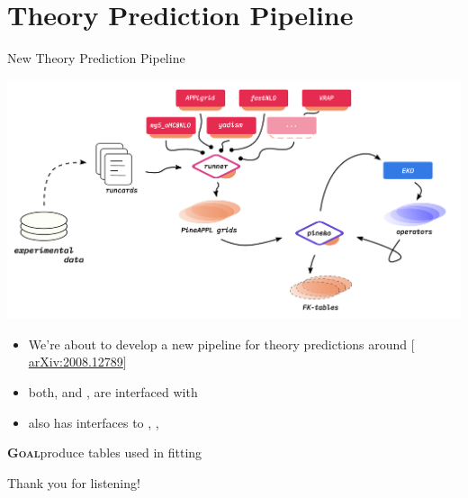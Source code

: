 \documentclass[9pt]{beamer}
\providecommand{\iRef}[1]{{\color{mLightGreen}\small $[$#1$]$}}
\begin{document}
\section{Theory Prediction Pipeline}

\begin{frame}{New Theory Prediction Pipeline}
	\begin{center}
		\includegraphics[width=.8\linewidth]{fk}
	\end{center}

	\begin{itemize}
        \item We're about to develop a new pipeline for theory predictions
            around \pineappl{}
            \iRef{\href{https://arxiv.org/abs/2008.12789}{arXiv:2008.12789}}
		\item both, \eko and \yadism, are interfaced with \pineappl
        \item \pineappl also has interfaces to \madgraph, \appl, \fastnlo
	\end{itemize}

    \vspace*{10pt}
    \textbf{\textsc{Goal}}\quad produce \fk tables used in \pdf fitting
\end{frame}

\begin{frame}[standout]
    Thank you for listening!
\end{frame}

\appendix
\end{document}
